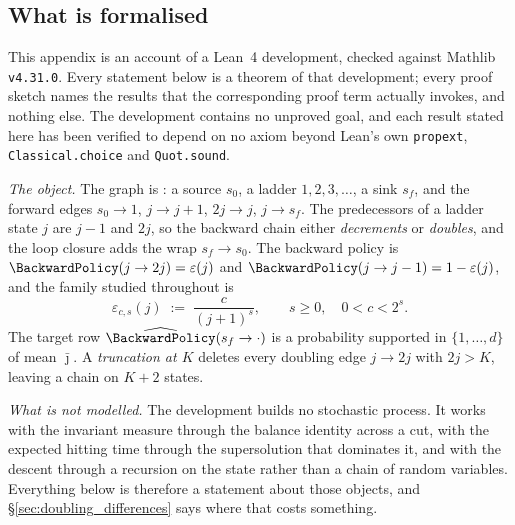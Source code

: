 \subsection{What is formalised}\label{sec:doubling_formal}

This appendix is an account of a Lean~4 development, checked against Mathlib
\texttt{v4.31.0}. Every statement below is a theorem of that development; every proof sketch
names the results that the corresponding proof term actually invokes, and nothing else. The
development contains no unproved goal, and each result stated here has been verified to depend
on no axiom beyond Lean's own \texttt{propext}, \texttt{Classical.choice} and
\texttt{Quot.sound}.

\medskip\noindent
\emph{The object.} The graph is : a source
$s_0$, a ladder $1,2,3,\dots$, a sink $s_f$, and the forward edges $s_0\rightarrow1$,
$j\rightarrow j+1$, $2j\rightarrow j$, $j\rightarrow s_f$. The predecessors of a ladder state
$j$ are $j-1$ and $2j$, so the backward chain either \emph{decrements} or \emph{doubles}, and
the loop closure adds the wrap $s_f\rightarrow s_0$. The backward policy is
$\BackwardPolicy(j\rightarrow2j)=\varepsilon(j)$ and
$\BackwardPolicy(j\rightarrow j-1)=1-\varepsilon(j)$, and the family studied throughout is
\begin{equation}\label{eq:doubling_family}
    \varepsilon_{c,s}(j)\;:=\;\frac{c}{(j+1)^{s}},\qquad s\geq0,\quad 0<c<2^{s} .
\end{equation}
The target row $\widehat\BackwardPolicy(s_f\rightarrow\cdot)$ is a probability supported in
$\{1,\dots,d\}$ of mean $\bar\jmath$. A \emph{truncation at $K$} deletes every doubling edge
$j\rightarrow2j$ with $2j>K$, leaving a chain on $K+2$ states.

\medskip\noindent
\emph{What is not modelled.} The development builds no stochastic process. It works with the
invariant measure through the balance identity across a cut, with the expected hitting time
through the supersolution that dominates it, and with the descent through a recursion on the
state rather than a chain of random variables. Everything below is therefore a statement about
those objects, and \S\ref{sec:doubling_differences} says where that costs something.
